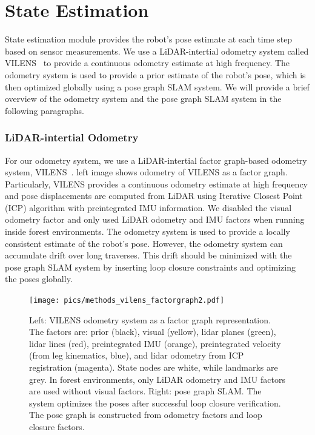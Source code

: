 \section{State Estimation}
State estimation module provides the robot's pose estimate at each time step based on sensor measurements. We use a LiDAR-intertial odometry system called VILENS~\cite{wisth2023tro} to provide a continuous odometry estimate at high frequency. The odometry system is used to provide a prior estimate of the robot's pose, which is then optimized globally using a pose graph SLAM system. We will provide a brief overview of the odometry system and the pose graph SLAM system in the following paragraphs. 

\subsubsection*{\textbf{LiDAR-intertial Odometry}} 
For our odometry system, we use a LiDAR-intertial factor graph-based odometry system, VILENS~\cite{wisth2023tro}.  left image shows odometry of VILENS as a factor graph. Particularly, VILENS provides a continuous odometry estimate at high frequency and pose displacements are computed from LiDAR using Iterative Closest Point (ICP) algorithm with preintegrated IMU information. We disabled the visual odometry factor and only used LiDAR odometry and IMU factors when running inside forest environments. 
The odometry system is used to provide a locally consistent estimate of the robot's pose. However, the odometry system can accumulate drift over long traverses. This drift should be minimized with the pose graph SLAM system by inserting loop closure constraints and optimizing the poses globally.  
\begin{figure}[t]
  \centering
  \texttt{[image: pics/methods\_vilens\_factorgraph2.pdf]}
  \caption{Left: VILENS odometry system as a factor graph representation. The factors are: prior (black), visual
 (yellow), lidar planes (green), lidar lines (red), preintegrated IMU (orange), preintegrated velocity (from leg kinematics, blue), and lidar odometry from ICP registration (magenta). State nodes are white, while landmarks are grey. In forest environments, only LiDAR odometry and IMU factors are used without visual factors. Right: pose graph SLAM. The system optimizes the poses after successful loop closure verification. The pose graph is constructed from odometry factors and loop closure factors.}
  \label{fig:vilens_factorgraph}
\end{figure}

